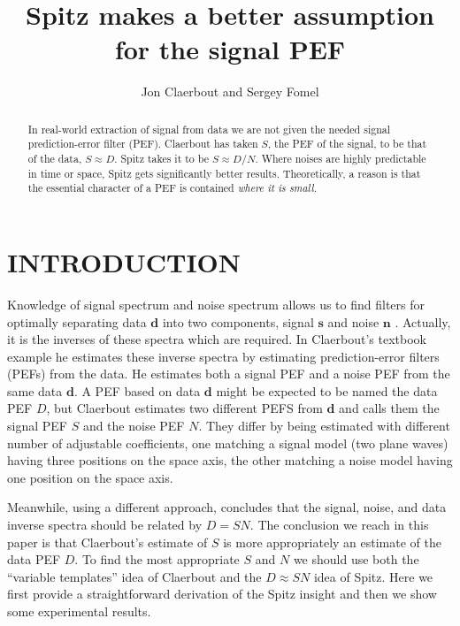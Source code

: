 


\title{Spitz makes a better assumption for the signal
  PEF}

\author{Jon Claerbout and Sergey Fomel}
\def\eq{\quad =\quad}
\maketitle

\begin{abstract}
In real-world extraction of signal from data we are not given the
needed signal prediction-error filter (PEF).  Claerbout has taken $S$,
the PEF of the signal, to be that of the data, $S\approx D$.  Spitz
takes it to be $S\approx D/N$.  Where noises are highly predictable in
time or space, Spitz gets significantly better results.
Theoretically, a reason is that the essential character of a PEF is
contained {\it where it is small.}
\end{abstract}


\section{INTRODUCTION}

Knowledge of signal spectrum and noise spectrum
allows us to find filters for optimally
separating data $\mathbf d$ into two components, signal $\mathbf s$
and noise $\mathbf n$ \cite[]{gee}.
Actually, it is the inverses of these spectra
which are required.
In Claerbout's textbook example 
he estimates these inverse spectra by estimating prediction-error filters
(PEFs) from the data.
He estimates both a signal PEF and a noise PEF from the same data $\mathbf d$.
A PEF based on data $\mathbf d$ might be expected to be named the data PEF $D$,
but Claerbout estimates two different PEFS from $\mathbf d$
and calls them the signal PEF $S$ and the noise PEF $N$.
They differ by being estimated with different number
of adjustable coefficients, one matching a signal model
(two plane waves) having three positions on the space axis,
the other matching a noise model
having one position on the space axis.
\par
Meanwhile, using a different approach,
\cite{TLE18-01-00550058} concludes
that the signal, noise, and data inverse spectra
should be related by $D=SN$.
The conclusion we reach in this paper
is that Claerbout's estimate of $S$ is more
appropriately an estimate of the data PEF $D$.
To find the most appropriate $S$ and $N$ we
should use both the ``variable templates'' idea of Claerbout
and the $D\approx SN$ idea of Spitz.
Here we first
provide a straightforward derivation of the Spitz insight
and then we show some experimental results.

